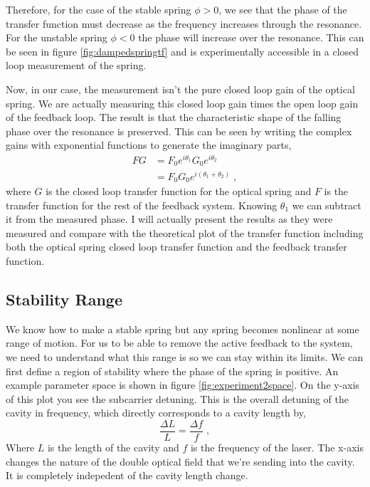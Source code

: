 Therefore, for the case of the stable spring $\phi>0$, we see that the phase of
the transfer function must decrease as the frequency increases through the
resonance.
For the unstable spring $\phi<0$ the phase will increase over the resonance.
This can be seen in figure \ref{fig:dampedspringtf} and is experimentally
accessible in a closed loop measurement of the spring.

Now, in our case, the measurement isn't the pure closed loop gain of the
optical spring.
We are actually measuring this closed loop gain times the open loop gain of the
feedback loop.
The result is that the characteristic shape of the falling phase over the
resonance is preserved.
This can be seen by writing the complex gains with exponential functions to
generate the imaginary parts,
\begin{align}
FG &= F_0e^{i\theta_1}G_0e^{i\theta_2} \nonumber \\
  &= F_0G_0e^{i(\theta_1+\theta_2)} \;,
\end{align}
where $G$ is the closed loop transfer function for the optical spring and
$F$ is the transfer function for the rest of the feedback system.
Knowing $\theta_1$ we can subtract it from the measured phase.
I will actually present the results as they were measured and compare with the
theoretical plot of the transfer function including both the optical spring
closed loop transfer function and the feedback transfer function.

\subsection{Stability Range}
\label{sec:results_stability}
We know how to make a stable spring but any spring becomes nonlinear at some
range of motion.
For us to be able to remove the active feedback to the system, we
need to understand what this range is so we can stay within its limits.
We can first define a region of stability where the phase of the spring is
positive.
An example parameter space is shown in figure \ref{fig:experiment2space}.
On the y-axis of this plot you see the subcarrier detuning. This is the
overall detuning of the cavity in frequency, which directly corresponds to
a cavity length by,
\begin{equation}
\frac{\Delta L}{L} = \frac{\Delta f}{f} \label{eq:lengthtofreq} \;,
\end{equation}
Where $L$ is the length of the cavity and $f$ is the frequency of the laser.
The x-axis changes the nature of the double optical field that we're sending
into the cavity.
It is completely indepedent of the cavity length change.

